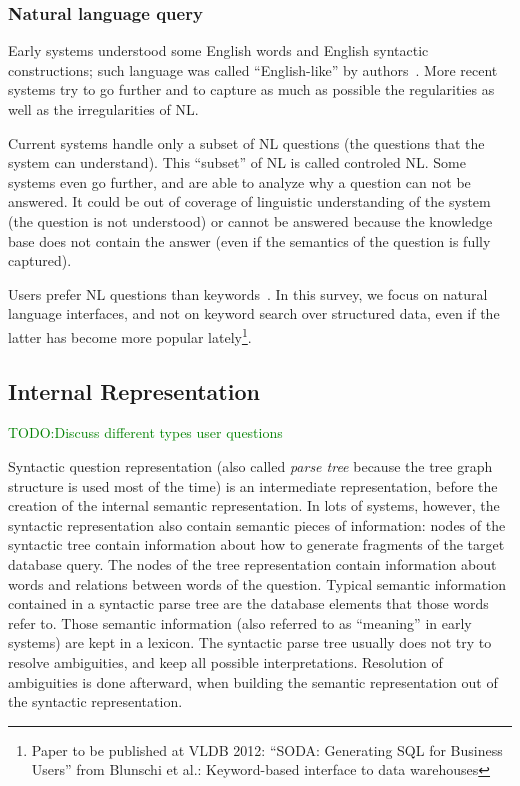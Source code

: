 \documentclass[10pt,journal,letterpaper,compsoc]{IEEEtran}
\newcommand{\TODO}[1]{{\textcolor{green}{TODO:#1}}}
\begin{document}
\subsubsection{Natural language query}
Early systems understood some English words and English syntactic constructions;
such language was called ``English-like'' by
authors~\cite{Woods:1973:PNL:1499586.1499695}. More recent systems try to go
further and to capture as much as possible the regularities as well as the
irregularities of NL.

Current systems handle only a subset of NL questions (the questions that the
system can understand). This ``subset'' of NL is called controled NL. Some
systems even go further, and are able to analyze why a question can not be
answered. It could be out of coverage of linguistic understanding of the system
(the question is not understood) or cannot be answered because the knowledge
base does not contain the answer (even if the semantics of the question is
fully captured).

Users prefer NL questions than keywords~\cite{Hearst:2011:NSU:2018396.2018414}.
In this survey, we focus on natural language interfaces, and not on keyword
search over structured data, even if the latter has become more popular
lately\footnote{Paper to be published at VLDB 2012: ``SODA: Generating SQL for
Business Users'' from Blunschi et al.: Keyword-based interface to data
warehouses}.




\subsection{Internal Representation}
\label{sec:big-picture-syntactic}
\TODO{Discuss different types user questions}


Syntactic question representation (also called {\it parse tree} because the
tree graph structure is used most of the time) is an intermediate
representation, before the creation of the internal semantic representation. In
lots of systems, however, the syntactic representation also contain semantic
pieces of information: nodes of the syntactic tree contain information about how
to generate fragments of the target database query. 
The nodes of the tree representation contain information about words and
relations between words of the question. 
Typical semantic information contained in a syntactic parse tree are the
database elements that those words refer to. 
Those semantic information (also referred to as ``meaning'' in early systems)
are kept in a lexicon. 
The syntactic parse tree usually does not try to resolve
ambiguities, and keep all possible interpretations. Resolution of ambiguities
is done afterward, when building the semantic representation out of the
syntactic representation.
\end{document}
